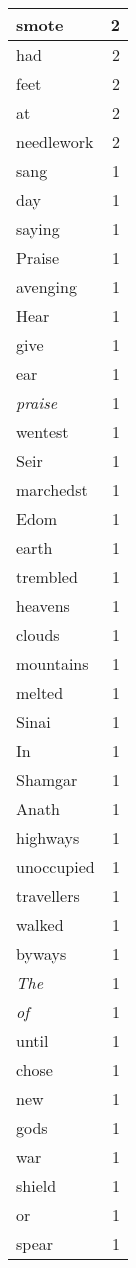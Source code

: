 \begin{center}
\begin{longtable}{l|r}
smote & 2\\ \hline 
had & 2\\ \hline 
feet & 2\\ \hline 
at & 2\\ \hline 
needlework & 2\\ \hline 
sang & 1\\ \hline 
day & 1\\ \hline 
saying & 1\\ \hline 
Praise & 1\\ \hline 
avenging & 1\\ \hline 
Hear & 1\\ \hline 
give & 1\\ \hline 
ear & 1\\ \hline 
\emph{praise} & 1\\ \hline 
wentest & 1\\ \hline 
Seir & 1\\ \hline 
marchedst & 1\\ \hline 
Edom & 1\\ \hline 
earth & 1\\ \hline 
trembled & 1\\ \hline 
heavens & 1\\ \hline 
clouds & 1\\ \hline 
mountains & 1\\ \hline 
melted & 1\\ \hline 
Sinai & 1\\ \hline 
In & 1\\ \hline 
Shamgar & 1\\ \hline 
Anath & 1\\ \hline 
highways & 1\\ \hline 
unoccupied & 1\\ \hline 
travellers & 1\\ \hline 
walked & 1\\ \hline 
byways & 1\\ \hline 
\emph{The} & 1\\ \hline 
\emph{of} & 1\\ \hline 
until & 1\\ \hline 
chose & 1\\ \hline 
new & 1\\ \hline 
gods & 1\\ \hline 
war & 1\\ \hline 
shield & 1\\ \hline 
or & 1\\ \hline 
spear & 1\\ \hline 

\end{longtable}
\end{center}
